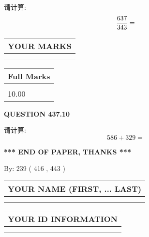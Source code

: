 \documentclass{ctexart}
\begin{document}
  
 
请计算:
\begin{equation}
\frac { %
637 }  {  %
343} = \nonumber
\end{equation}
 

 

 
  
\vspace{0.2in}
  
\noindent\begin{tabular}{|l|}
\hline
 YOUR MARKS  \\
\hline
 \\ 
 \\ 
\hline
\end{tabular}
\hspace{0.05in} \begin{tabular}{|l|}
\hline
 Full Marks  \\
\hline
 \\ 
10.00 \\
\hline
\end{tabular}
{\textbf{\Large{QUESTION
437.10 
}}}
  
  
 
请计算:
\begin{equation}
586 +  %
329 = \nonumber
\end{equation}
 

 

 
   
   
 \vspace{0.2in}
 
   
   
   
   
\vspace{1.0in} 
{\textbf{\large{ *** END OF PAPER, THANKS *** }}} 
   
   
\hspace{1.0in} By: 
 239 ( 416 ,  443 )
   
   
   
   
\newpage 
\setcounter{page}{ 
   438001 } 
   
   
   
   
\noindent\begin{tabular}{|l|}
\hline
YOUR NAME (FIRST, ... LAST)  \\
\hline
 \\ 
 \\ 
\hline
\end{tabular}
\hspace{0.05in} \begin{tabular}{|l|}
\hline
 YOUR   ID   INFORMATION  \\
\hline
 \\ 
 \\ 
\hline
\end{tabular}
   
\end{document}
